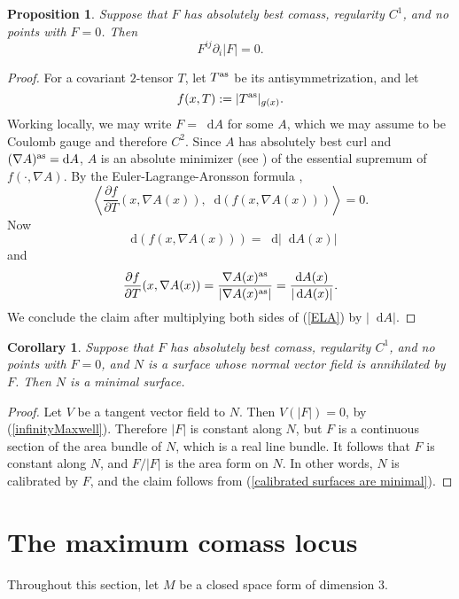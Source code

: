 \documentclass[reqno,11pt]{amsart}
\newcommand*\dif{\mathop{}\!\mathrm{d}}
\newtheorem{proposition}[theorem]{Proposition}
\newtheorem{corollary}[theorem]{Corollary}
\theoremstyle{definition}
\numberwithin{equation}{section}
\begin{document}
\begin{proposition}
Suppose that $F$ has absolutely best comass, regularity $C^1$, and no points with $F = 0$. Then
\begin{equation}\label{infinityMaxwell}
	F^{ij} \partial_i |F| = 0.
\end{equation}
\end{proposition}
\begin{proof}
For a covariant $2$-tensor $T$, let $T^{\rm as}$ be its antisymmetrization, and let
$$f(x, T) := |T^{\rm as}|_{g(x)}.$$
Working locally, we may write $F = \dif A$ for some $A$, which we may assume to be Coulomb gauge and therefore $C^2$.
Since $A$ has absolutely best curl and $(\nabla A)^{\rm as} = \dif A$, $A$ is an absolute minimizer (see \cite[Definition 5.1]{Barron2001}) of the essential supremum of $f(\cdot, \nabla A)$.
By the Euler-Lagrange-Aronsson formula \cite[Theorem 5.2]{Barron2001},
\begin{equation}\label{ELA}
	\left\langle \frac{\partial f}{\partial T}(x, \nabla A(x)), \dif (f(x, \nabla A(x))) \right\rangle = 0.
\end{equation}
Now
$$\dif(f(x, \nabla A(x))) = \dif |\dif A(x)|$$
and 
$$\frac{\partial f}{\partial T}(x, \nabla A(x)) = \frac{\nabla A(x)^{\rm as}}{|\nabla A(x)^{\rm as}|} = \frac{\dif A(x)}{|\dif A(x)|}.$$
We conclude the claim after multiplying both sides of (\ref{ELA}) by $|\dif A|$.
\end{proof}

\begin{corollary}
Suppose that $F$ has absolutely best comass, regularity $C^1$, and no points with $F = 0$, and $N$ is a surface whose normal vector field is annihilated by $F$.
Then $N$ is a minimal surface.
\end{corollary}
\begin{proof}
Let $V$ be a tangent vector field to $N$. Then $V(|F|) = 0$, by (\ref{infinityMaxwell}).
Therefore $|F|$ is constant along $N$, but $F$ is a continuous section of the area bundle of $N$, which is a real line bundle.
It follows that $F$ is constant along $N$, and $F/|F|$ is the area form on $N$.
In other words, $N$ is calibrated by $F$, and the claim follows from (\ref{calibrated surfaces are minimal}).
\end{proof}


\section{The maximum comass locus}
Throughout this section, let $M$ be a closed space form of dimension $3$.
\end{document}
